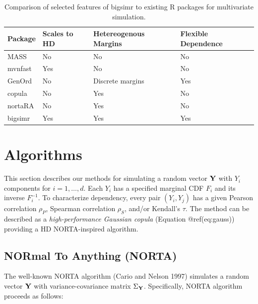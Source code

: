 \documentclass{article}
\begin{document}
\begin{table}[h]
\centering
\caption{\label{tab:compare-table}Comparison of selected features of bigsimr to existing R packages for multivariate simulation.}
\begin{tabular}{@{}llll@{}}
Package & Scales to HD & Hetereogenous Margins & Flexible Dependence \\ \midrule
MASS      & No           & No                    & No                  \\
mvnfast   & Yes          & No                    & No                  \\
GenOrd    & No           & Discrete margins      & Yes                 \\
copula    & No           & Yes                   & No                  \\
nortaRA   & No           & Yes                   & No                  \\
bigsimr   & Yes          & Yes                   & Yes                
\end{tabular}
\end{table}

\hypertarget{algorithms}{%
\section{Algorithms}\label{algorithms}}

This section describes our methods for simulating a random vector
\(\bf Y\) with \(Y_i\) components for \(i=1,\ldots,d\). Each \(Y_i\) has
a specified marginal CDF \(F_i\) and its inverse \(F^{-1}_i\). To
characterize dependency, every pair \((Y_i, Y_j)\) has a given Pearson
correlation \(\rho_P\), Spearman correlation \(\rho_S\), and/or
Kendall's \(\tau\). The method can be described as a
\emph{high-performance Gaussian copula} (Equation @ref(eq:gauss))
providing a HD NORTA-inspired algorithm.

\hypertarget{normal-to-anything-norta}{%
\subsection{NORmal To Anything (NORTA)}\label{normal-to-anything-norta}}

The well-known NORTA algorithm (Cario and Nelson 1997) simulates a
random vector \(\bf Y\) with variance-covariance matrix
\(\Sigma_{\bf Y}\). Specifically, NORTA algorithm proceeds as follows:
\end{document}
